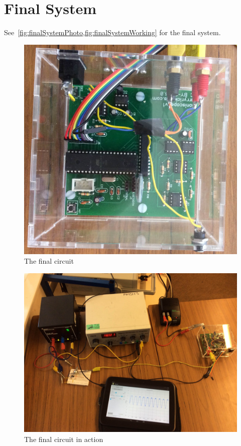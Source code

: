 \section{Final System}

See~\cref{fig:finalSystemPhoto,fig:finalSystemWorking} for the final system.

\begin{figure}[h]
  \includegraphics[width=\linewidth]{img/finalSystemPhoto.jpg}
  \caption{The final circuit}
  \label{fig:finalSystemPhoto}
\end{figure}

\begin{figure}[h]
  \includegraphics[width=\linewidth]{img/finalSystemWorking.jpg}
  \caption{The final circuit in action}
  \label{fig:finalSystemWorking}
\end{figure}
